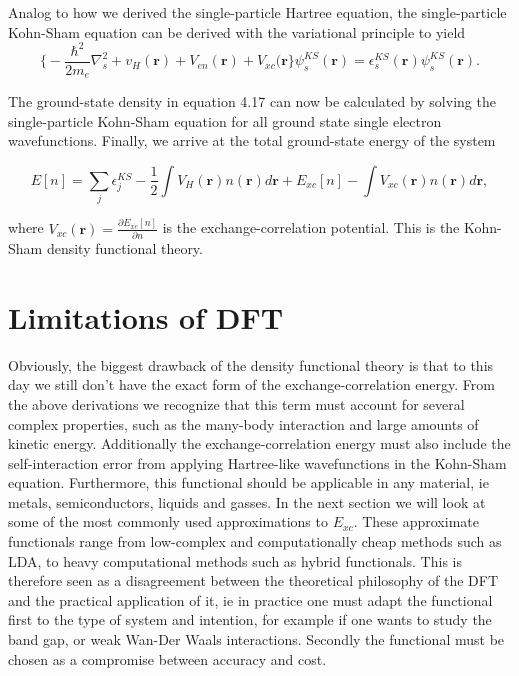 Analog to how we derived the single-particle Hartree equation, the single-particle Kohn-Sham equation can be derived with the variational principle to yield
\begin{equation}
    \bigg\{ -\frac{\hbar^2}{2m_e}\nabla^2_s + v_H(\boldsymbol{r}) + V_{en}(\boldsymbol{r}) + V_{xc}(\boldsymbol{r} \bigg\}\psi_s^{KS}(\boldsymbol{r}) = \epsilon_s^{KS}(\boldsymbol{r})\psi_s^{KS}(\boldsymbol{r}).
\end{equation}

The ground-state density in equation 4.17 can now be calculated by solving the single-particle Kohn-Sham equation for all ground state single electron wavefunctions. Finally, we arrive at the total ground-state energy of the system

\begin{equation}
E[n] = \sum_j \epsilon_j^{KS} - \frac{1}{2} \int V_H(\boldsymbol{r})n(\boldsymbol{r})d\boldsymbol{r} + E_{xc}[n] - \int V_{xc}(\boldsymbol{r})n(\boldsymbol{r})d\boldsymbol{r}, 
\end{equation}

where $V_{xc}(\boldsymbol{r}) = \frac{\partial E_{xc}[n]}{\partial n}$ is the exchange-correlation potential. This is the Kohn-Sham density functional theory.
 
 

\section{Limitations of DFT}
Obviously, the biggest drawback of the density functional theory is that to this day we still don't have the exact form of the exchange-correlation energy. From the above derivations we recognize that this term must account for several complex properties, such as the many-body interaction and large amounts of kinetic energy. Additionally the exchange-correlation energy must also include the self-interaction error from applying Hartree-like wavefunctions in the Kohn-Sham equation. Furthermore, this functional should be applicable in any material, ie metals, semiconductors, liquids and gasses. In the next section we will look at some of the most commonly used approximations to $E_{xc}$. These approximate functionals range from low-complex and computationally cheap methods such as LDA, to heavy computational methods such as hybrid functionals. This is therefore seen as a disagreement between the theoretical philosophy of the DFT and the practical application of it, ie in practice one must adapt the functional first to the type of system and intention, for example if one wants to study the band gap, or weak Wan-Der Waals interactions. Secondly the functional must be chosen as a compromise between accuracy and cost.

